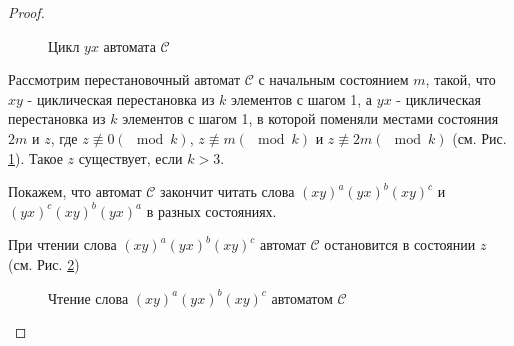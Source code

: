 \documentclass{article}
\begin{document}
\begin{proof}
\begin{enumerate}
			\begin{figure}
				\caption{Цикл $yx$ автомата $\mathscr{C}$}
				\label{cycle_2m_z}
			\end{figure}
			
			Рассмотрим перестановочный автомат $\mathscr{C}$ с начальным состоянием $m$, такой, что $xy$ - циклическая перестановка из $k$ элементов с шагом 1, а $yx$ - циклическая перестановка из $k$ элементов с шагом 1, в которой поменяли местами состояния $2m$ и $z$, где $z \not \equiv 0 (\mod k)$, $z \not \equiv m (\mod k)$ и $z \not \equiv 2m (\mod k)$ (см. Рис. \ref{cycle_2m_z}). Такое $z$ существует, если $k > 3$.
			
			Покажем, что автомат $\mathscr{C}$ закончит читать слова $(xy)^a(yx)^b(xy)^c$ и $(yx)^c(xy)^b(yx)^a$ в разных состояниях.
			
			При чтении слова $(xy)^a(yx)^b(xy)^c$ автомат $\mathscr{C}$ остановится в состоянии $z$ (см. Рис. \ref{process1_2m_z})
			
			\begin{figure}
				\caption{Чтение слова $(xy)^a(yx)^b(xy)^c$ автоматом $\mathscr{C}$}
				\label{process1_2m_z}
			\end{figure}
		

\end{enumerate}
\end{proof}
\end{document}
